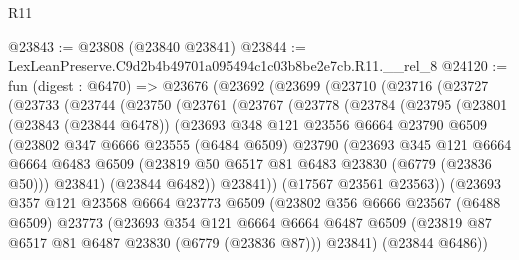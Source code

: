 \begin{lexlean}{R11}
\begin{coremodule}
@23843 := @23808 (@23840 @23841)
@23844 := LexLeanPreserve.C9d2b4b49701a095494c1c03b8be2e7cb.R11.__rel_8
@24120 := fun (digest : @6470) =>
  @23676
    (@23692
      (@23699
        (@23710
          (@23716
            (@23727
              (@23733
                (@23744
                  (@23750
                    (@23761
                      (@23767
                        (@23778
                          (@23784
                            (@23795
                              (@23801
                                (@23843 (@23844 @6478))
                                (@23693
                                  @348
                                  @121
                                  @23556
                                  @6664
                                  @23790
                                  @6509
                                  (@23802
                                    @347
                                    @6666
                                    @23555
                                    (@6484 @6509)
                                    @23790
                                    (@23693
                                      @345
                                      @121
                                      @6664
                                      @6664
                                      @6483
                                      @6509
                                      (@23819 @50 @6517 @81 @6483 @23830 (@6779 (@23836 @50)))
                                      @23841)
                                    (@23844 @6482))
                                  @23841))
                              (@17567 @23561 @23563))
                            (@23693
                              @357
                              @121
                              @23568
                              @6664
                              @23773
                              @6509
                              (@23802
                                @356
                                @6666
                                @23567
                                (@6488 @6509)
                                @23773
                                (@23693
                                  @354
                                  @121
                                  @6664
                                  @6664
                                  @6487
                                  @6509
                                  (@23819 @87 @6517 @81 @6487 @23830 (@6779 (@23836 @87)))
                                  @23841)
                                (@23844 @6486))

\end{coremodule}
\end{lexlean}

